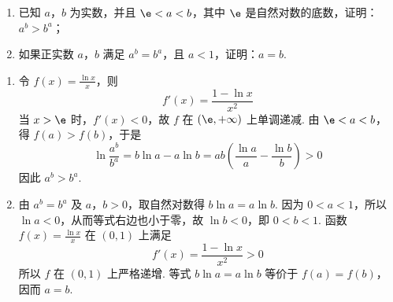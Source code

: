 \documentclass[UTF8,a4paper,oneside,11pt]{ctexbook}
\begin{document}
\begin{problem}
\begin{enumerate}
\item 已知 \(a\)，\(b\) 为实数，并且 \(\e < a < b\)，其中 \(\e\) 是自然对数的底数，证明：\(a^b > b^a\)；
\item 如果正实数 \(a\)，\(b\) 满足 \(a^b = b^a\)，且 \(a < 1\)，证明：\(a = b\).
\end{enumerate}

\begin{solution}
\begin{enumerate}
\item 令 \(f(x)=\frac{\ln x}{x}\)，则
\[
f'(x)=\frac{1-\ln x}{x^{2}}
\]
当 \(x>\e\) 时，\(f'(x)<0\)，故 \(f\) 在 \((\e,+\infty)\) 上单调递减. 由 \(\e<a<b\)，得 \(f(a)>f(b)\)，于是
\[
\ln\frac{a^{b}}{b^{a}}=b\ln a-a\ln b=ab\left(\frac{\ln a}{a}-\frac{\ln b}{b}\right)>0
\]
因此 \(a^{b}>b^{a}\).
\item 由 \(a^{b}=b^{a}\) 及 \(a\)，\(b>0\)，取自然对数得 \(b\ln a=a\ln b\). 因为 \(0<a<1\)，所以 \(\ln a<0\)，从而等式右边也小于零，故 \(\ln b<0\)，即 \(0<b<1\). 函数 \(f(x)=\frac{\ln x}{x}\) 在 \((0,1)\) 上满足
\[
f'(x)=\frac{1-\ln x}{x^{2}}>0
\]
所以 \(f\) 在 \((0,1)\) 上严格递增. 等式 \(b\ln a=a\ln b\) 等价于 \(f(a)=f(b)\)，因而 \(a=b\).
\end{enumerate}
\end{solution}
\end{problem}

\end{document}

